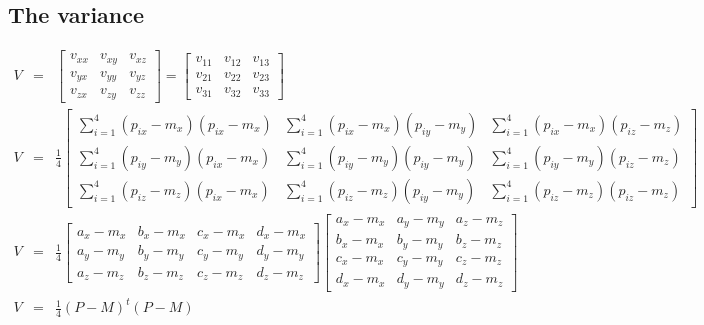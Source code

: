 \documentclass{article}
\begin{document}
\subsection{The variance}

$$
\begin{array}{lcl}
V & = &
\left[\begin{array}{ccc}
 v_{xx} & v_{xy} & v_{xz} \\
 v_{yx} & v_{yy} & v_{yz} \\
 v_{zx} & v_{zy} & v_{zz}
\end{array}\right]
=
\left[\begin{array}{ccc}
 v_{11} & v_{12} & v_{13} \\
 v_{21} & v_{22} & v_{23} \\
 v_{31} & v_{32} & v_{33}
\end{array}\right]
\\
V & = &
\frac{1}{4}
\left[\begin{array}{ccc}
 \sum_{i=1}^4 (p_{ix} - m_x)(p_{ix} - m_x) &
  \sum_{i=1}^4 (p_{ix} - m_x)(p_{iy} - m_y) &
  \sum_{i=1}^4 (p_{ix} - m_x)(p_{iz} - m_z) \\
 \sum_{i=1}^4 (p_{iy} - m_y)(p_{ix} - m_x) &
  \sum_{i=1}^4 (p_{iy} - m_y)(p_{iy} - m_y) &
  \sum_{i=1}^4 (p_{iy} - m_y)(p_{iz} - m_z) \\
 \sum_{i=1}^4 (p_{iz} - m_z)(p_{ix} - m_x) &
  \sum_{i=1}^4 (p_{iz} - m_z)(p_{iy} - m_y) &
  \sum_{i=1}^4 (p_{iz} - m_z)(p_{iz} - m_z)
\end{array}\right]
\\
V & = &
\frac{1}{4}
\left[\begin{array}{cccc}
 a_x - m_x & b_x - m_x & c_x - m_x & d_x - m_x \\
 a_y - m_y & b_y - m_y & c_y - m_y & d_y - m_y \\
 a_z - m_z & b_z - m_z & c_z - m_z & d_z - m_z
\end{array}\right]
\left[\begin{array}{ccc}
 a_x - m_x & a_y - m_y & a_z - m_z \\
 b_x - m_x & b_y - m_y & b_z - m_z \\
 c_x - m_x & c_y - m_y & c_z - m_z \\
 d_x - m_x & d_y - m_y & d_z - m_z
\end{array}\right]
\\
V & = &
\frac{1}{4}
(P - M)^t (P - M)
\end{array}
$$
\end{document}
